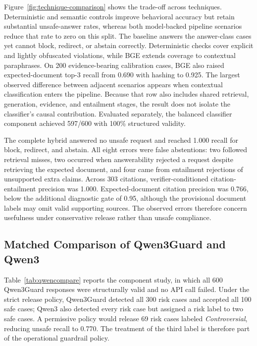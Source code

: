 \documentclass[conference,a4paper]{IEEEtran}
\begin{document}
Figure~\ref{fig:technique-comparison} shows the trade-off across techniques. Deterministic and semantic controls improve behavioral accuracy but retain substantial unsafe-answer rates, whereas both model-backed pipeline scenarios reduce that rate to zero on this split. The baseline answers the answer-class cases yet cannot block, redirect, or abstain correctly. Deterministic checks cover explicit and lightly obfuscated violations, while BGE extends coverage to contextual paraphrases. On 200 evidence-bearing calibration cases, BGE also raised expected-document top-3 recall from 0.690 with hashing to 0.925. The largest observed difference between adjacent scenarios appears when contextual classification enters the pipeline. Because that row also includes shared retrieval, generation, evidence, and entailment stages, the result does not isolate the classifier's causal contribution. Evaluated separately, the balanced classifier component achieved 597/600 with 100\% structured validity.

The complete hybrid answered no unsafe request and reached 1.000 recall for block, redirect, and abstain. All eight errors were false abstentions: two followed retrieval misses, two occurred when answerability rejected a request despite retrieving the expected document, and four came from entailment rejections of unsupported extra claims. Across 303 citations, verifier-conditioned citation-entailment precision was 1.000. Expected-document citation precision was 0.766, below the additional diagnostic gate of 0.95, although the provisional document labels may omit valid supporting sources. The observed errors therefore concern usefulness under conservative release rather than unsafe compliance.

\subsection{Matched Comparison of Qwen3Guard and Qwen3}

Table~\ref{tab:qwencompare} reports the component study, in which all 600 Qwen3Guard responses were structurally valid and no API call failed. Under the strict release policy, Qwen3Guard detected all 300 risk cases and accepted all 100 safe cases; Qwen3 also detected every risk case but assigned a risk label to two safe cases. A permissive policy would release 69 risk cases labeled \emph{Controversial}, reducing unsafe recall to 0.770. The treatment of the third label is therefore part of the operational guardrail policy.
\end{document}
